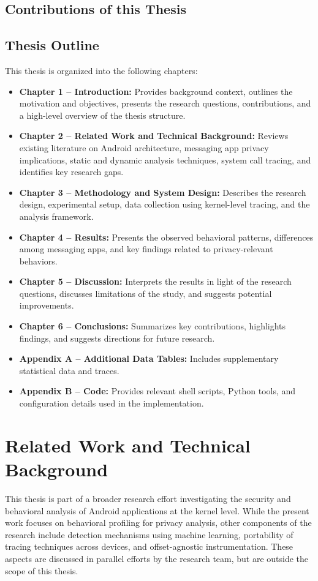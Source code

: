 \documentclass[a4paper,12pt]{report}
\begin{document}
\section{Contributions of this Thesis}

\section{Thesis Outline}
This thesis is organized into the following chapters:

\begin{itemize}
\item \textbf{Chapter 1 – Introduction:} Provides background context, outlines the motivation and objectives, presents the research questions, contributions, and a high-level overview of the thesis structure.
\item \textbf{Chapter 2 – Related Work and Technical Background:} Reviews existing literature on Android architecture, messaging app privacy implications, static and dynamic analysis techniques, system call tracing, and identifies key research gaps.
\item \textbf{Chapter 3 – Methodology and System Design:} Describes the research design, experimental setup, data collection using kernel-level tracing, and the analysis framework.
\item \textbf{Chapter 4 – Results:} Presents the observed behavioral patterns, differences among messaging apps, and key findings related to privacy-relevant behaviors.
\item \textbf{Chapter 5 – Discussion:} Interprets the results in light of the research questions, discusses limitations of the study, and suggests potential improvements.
\item \textbf{Chapter 6 – Conclusions:} Summarizes key contributions, highlights findings, and suggests directions for future research.
\item \textbf{Appendix A – Additional Data Tables:} Includes supplementary statistical data and traces.
\item \textbf{Appendix B – Code:} Provides relevant shell scripts, Python tools, and configuration details used in the implementation.
\end{itemize}


\chapter{Related Work and Technical Background}
This thesis is part of a broader research effort investigating the security and behavioral analysis of Android applications at the kernel level. While the present work focuses on behavioral profiling for privacy analysis, other components of the research include detection mechanisms using machine learning, portability of tracing techniques across devices, and offset-agnostic instrumentation. These aspects are discussed in parallel efforts by the research team, but are outside the scope of this thesis.
\end{document}
